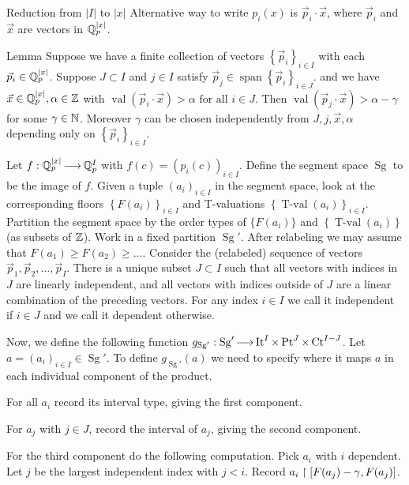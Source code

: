 \documentclass[final]{beamer}
\newcommand{\curly}[1]{\left\{ #1 \right\}}
\DeclareMathOperator{\Sg}{Sg}
\DeclareMathOperator{\Bt}{It}
\DeclareMathOperator{\Pt}{Pt}
\DeclareMathOperator{\Ct}{Ct}
\DeclareMathOperator{\vecspan}{span}
\DeclareMathOperator{\vval}{val}
\DeclareMathOperator{\tval}{T-val}
\newlength{\onecolwid}
\begin{document}
\begin{frame}[t]
\begin{columns}[t]
\begin{column}{\onecolwid}
\begin{block}{Reduction from $|I|$ to $|x|$}
        Alternative way to write $p_i(x)$ is $\vec p_i \cdot \vec x$,
        where $\vec p_i$ and $\vec x$ are vectors in $\mathbb{Q}_p^{|x|}$.
        \begin{alertblock}{Lemma}
            Suppose we have a finite collection of vectors $\curly{\vec p_i}_{i \in I}$ with each $\vec p_i \in \mathbb{Q}_p^{|x|}$.
            Suppose $J \subset I$ and $j \in I$ satisfy
                    $\vec p_j \in \vecspan \curly{\vec p_i}_{i \in J} $.
            and we have $\vec x \in \mathbb{Q}_p^{|x|}, \alpha \in \mathbb{Z}$ with
                    $\vval(\vec p_i \cdot \vec x) > \alpha \text{ for all } i \in J$.
            Then
                    $\vval(\vec p_j \cdot \vec x) > \alpha - \gamma$
            for some $\gamma \in \mathbb{N}$.
            Moreover $\gamma$ can be chosen independently from $J, j, \vec x, \alpha$ depending only on $\curly{\vec p_i}_{i \in I}$.
        \end{alertblock}          
        Let $f: \mathbb{Q}_p^{|x|} \operatorname{\longrightarrow} \mathbb{Q}_p^I$ with $f(c) = (p_i(c))_{i \in I}$.
        Define the segment space $\Sg$ to be the image of $f$.
        Given a tuple $(a_i)_{i\in I}$ in the segment space,
        look at the corresponding floors $\curly{F(a_i)}_{i\in I}$ and T-valuations $\curly{\tval(a_i)}_{i\in I}$.
        Partition the segment space by the order types of $\{F(a_i)\}$ and $\curly{\tval(a_i)}$ (as subsets of $\mathbb{Z}$).
        Work in a fixed partition $\Sg'$.
        After relabeling we may assume that $F(a_1) \geq F(a_2) \geq \ldots$.
        Consider the (relabeled) sequence of vectors $\vec p_1, \vec p_2, \ldots, \vec p_I$.
        There is a unique subset $J \subset I$ such that all vectors with indices in $J$ are linearly independent,
        and all vectors with indices outside of $J$ are a linear combination of the preceding vectors.
        For any index $i \in I$ we call it independent if $i \in J$ and we call it dependent otherwise.

        Now, we define the following function
                $g_{\Sg'}: \Sg' \arr \Bt^I \times \Pt^J \times \Ct^{I - J}$.
        Let $a = (a_i)_{i\in I} \in \Sg'$.
        To define $g_{\Sg'}(a)$ we need to specify where it maps $a$ in each individual component of the product.

        For all $a_i$ record its interval type, giving the first component.

        For $a_j$ with $j \in J$, record the interval of $a_j$, giving the second component.

        For the third component do the following computation.
        Pick $a_i$ with $i$ dependent.
        Let $j$ be the largest independent index with $j < i$.
        Record $a_i \upharpoonright [F(a_j) - \gamma, F(a_j)]$.


\end{block}
\end{column}
\end{columns}
\end{frame}
\end{document}
